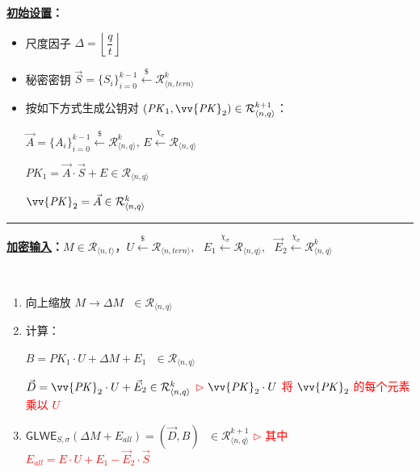 \begin{tcolorbox}[title={\textbf{\tboxlabel{\ref*{subsec:glwe-public-key-enc}} RLWE 公钥加密（$k=1$）}}]

\textbf{\underline{初始设置}：}
\begin{itemize}
\item 尺度因子 $\Delta = \left\lfloor\dfrac{q}{t}\right\rfloor$
\item 秘密密钥 $\vec{S} = \{S_i\}_{i=0}^{k-1} \xleftarrow{\$} \mathcal{R}_{\langle n, \textit{tern} \rangle}^k$
\item 按如下方式生成公钥对 $(\mathit{PK}_1, \vv{\mathit{PK}}_2) \in \mathcal{R}_{\langle n, q \rangle}^{k+1}$：

$\vec{A} = \{A_i\}_{i=0}^{k-1} \xleftarrow{\$} \mathcal{R}_{\langle n, q \rangle}^k$, \text{ } $E \xleftarrow{\chi_{\sigma}} \mathcal{R}_{\langle n, q \rangle}$

$\mathit{PK}_1 = \vec{A} \cdot \vec{S} + E \in \mathcal{R}_{\langle n, q \rangle}$

$\vv{\mathit{PK}}_2 = \vec{A} \in \mathcal{R}_{\langle n, q \rangle}^{k}$

\end{itemize}

\par\noindent\rule{\textwidth}{0.4pt}

\textbf{\underline{加密输入}：}$M \in \mathcal{R}_{\langle n, t \rangle}$，\text{ }$U \xleftarrow{\$} \mathcal{R}_{\langle n,\textit{tern} \rangle}, \text{ } E_1 \xleftarrow{\chi_{\sigma}} \mathcal{R}_{\langle n,q \rangle}, \text{ } \vec{E}_2 \xleftarrow{\chi_{\sigma}} \mathcal{R}_{\langle n,q \rangle}^k$

$ $

\begin{enumerate}

\item 向上缩放 $M \longrightarrow \Delta M \text { } \in \mathcal{R}_{\langle n, q\rangle}$

\item 计算：

$B = \mathit{PK}_1\cdot U + \Delta  M + E_1 \text{ } \in \mathcal{R}_{\langle n,q \rangle}$

$\vec{D} = \vv{{\mathit{PK}}}_2 \cdot U + \vec{E}_2 \in \mathcal{R}_{\langle n,q \rangle}^{k}$ \textcolor{red}{ $\rhd$ $\vv{\mathit{PK}}_2 \cdot U$ 将 $\vv{\mathit{PK}}_2$ 的每个元素乘以 $U$}

\item $\textsf{GLWE}_{S,\sigma}(\Delta M + E_{\mathit{all}}) = (\vec{D}, B) \text{ } \in \mathcal{R}_{\langle n,q \rangle}^{k+1}$ \textcolor{red}{ $\rhd$ 其中 $E_{\mathit{all}} = E \cdot U + E_1 - \vec{E}_2\cdot\vec{S}$}




\end{enumerate}
\end{tcolorbox}
